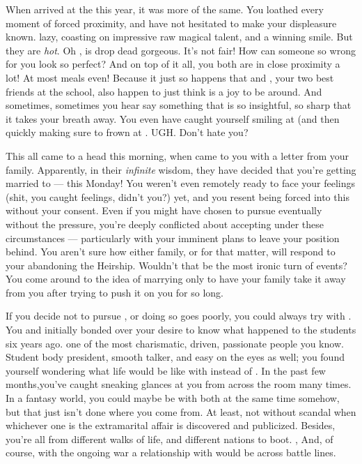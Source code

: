 \documentclass[char]{GL2020}
\begin{document}
When \cChupStudent{\they} arrived at the \pSchool{} this year, it was more of the same. You loathed every moment of forced proximity, and have not hesitated to make your displeasure known. \cChupStudent{\They \are} lazy, coasting on impressive raw magical talent, and a winning smile. But they are \emph{hot}. Oh \cTechGod{}, \cChupStudent{} is drop dead gorgeous. It’s not fair! How can someone so wrong for you look so perfect? And on top of it all, you both are in close proximity a lot!  At most meals even!  Because it just so happens that \cAmbition{} and \cPresident{}, your two best friends at the school, also happen to just think \cChupStudent{} is a joy to be around.  And sometimes, sometimes you hear \cChupStudent{} say something that is so insightful, so sharp that it takes your breath away.  You even have caught yourself smiling at \cChupStudent{} (and then quickly making sure to frown at \cChupStudent{\them}.  UGH.  Don’t \cChupStudent{\they} hate you?  

This all came to a head this morning, when \cDiplomat{} came to you with a letter from your family. Apparently, in their \emph{infinite} wisdom, they have decided that you're getting married to \cChupStudent{} — this Monday! You weren't even remotely ready to face your feelings (shit, you caught feelings, didn’t you?) yet, and you resent being forced into this without your consent. Even if you might have chosen to pursue \cChupStudent{} eventually without the pressure, you're deeply conflicted about accepting under these circumstances — particularly with your imminent plans to leave your position behind. You aren't sure how either family, or \cChupStudent{} for that matter, will respond to your abandoning the Heirship. Wouldn't that be the most ironic turn of events? You come around to the idea of marrying \cChupStudent{} only to have your family take it away from you after trying to push it on you for so long. 

If you decide not to pursue \cChupStudent{}, or doing so goes poorly, you could always try with \cPresident{\full}. You and \cPresident{} initially bonded over your desire to know what happened to the students six years ago. \cPresident{\They} \cPresident{\are} one of the most charismatic, driven, passionate people you know.   Student body president, smooth talker, and easy on the eyes as well; you  found yourself wondering what life would be like with \cPresident{} instead of \cChupStudent{}. In the past few months,you've caught \cPresident{} sneaking glances at you from across the room many times. In a fantasy world, you could maybe be with both at the same time somehow, but that just isn't done where you come from. At least, not without scandal when whichever one is the extramarital affair is discovered and publicized. Besides, you're all from different walks of life, and different nations to boot. , And, of course, with the ongoing war a relationship with \cPresident{} would be across battle lines.
\end{document}
